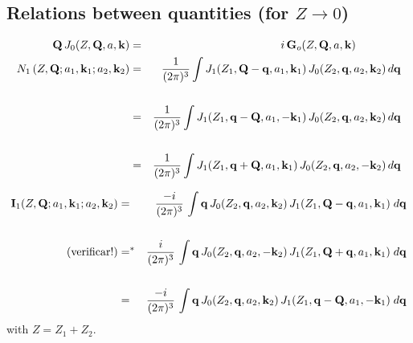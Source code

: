 \subsection{Relations between quantities (for $Z \to 0$)}
%
\begin{eqnarray} \label{Q-N1-Ja}
\mathbf{Q} \, J_{0}(Z , \mathbf{Q}, a , \mathbf{k}) &=& i \, \mathbf{G}_{o} (Z ,
\mathbf{Q}, a , \mathbf{k}) \qquad \qquad
 \\
N_{1} \left(Z,  \mathbf{Q} ; a_{1}, \mathbf{k}_{1} ; a_{2}, \mathbf{k}_{2} \right)
&=&  \frac{1}{(2 \pi)^{3}} \int J_{1}(Z_{1}, \mathbf{Q}
-\mathbf{q},a_{1},\mathbf{k}_{1}) \, J_{0}(Z_{2},  \mathbf{q} ,a_{2},\mathbf{k}_{2} )
\, d \mathbf{q}
 \nonumber \\ \\ \label{Q-N1-Jb}
&=& \frac{1}{(2 \pi)^{3}} \int J_{1}(Z_{1},\mathbf{q} - \mathbf{Q}, a_{1},-
\mathbf{k}_{1}) \, J_{0}(Z_{2}, \mathbf{q} ,a_{2},\mathbf{k}_{2} ) \, d \mathbf{q}
 \nonumber \\ \\ \label{Q-N1-Jc}
&=& \frac{1}{(2 \pi)^{3}} \int J_{1}( Z_{1}, \mathbf{q} + \mathbf{Q}, a_{1},
\mathbf{k}_{1} ) \, J_{0}(Z_{2}, \mathbf{q}  ,a_{2},-\mathbf{k}_{2} ) \, d
\mathbf{q}
\nonumber \\
\end{eqnarray}

\begin{eqnarray} \label{Q-I1-Ja}
\mathbf{I}_{1}(Z,\mathbf{Q}; a_{1},\mathbf{k}_{1}; a_{2},\mathbf{k}_{2} ) &=&\frac{-
i }{(2 \pi)^{3}}\,\int \mathbf{q} \, J_{0}(Z_{2}, \mathbf{q},
a_{2},\mathbf{k}_{2}) \,
J_{1}(Z_{1}, \mathbf{Q}- \mathbf{q}, a_{1}, \mathbf{k}_{1} ) \; d \mathbf{q}
\nonumber \\ \\
\label{Q-I1-Jb} \mbox{(verificar!)} &=^{*}&  \frac{i }{(2
\pi)^{3}}\,\int \mathbf{q} \, J_{0}(Z_{2}, \mathbf{q}, a_{2}, - \mathbf{k}_{2}) \,
J_{1}(Z_{1}, \mathbf{Q} + \mathbf{q}, a_{1}, \mathbf{k}_{1} ) \; d \mathbf{q}
\nonumber \\  \\  \label{Q-I1-Jc} &=&\frac{- i }{(2 \pi)^{3}}\,\int
\mathbf{q} \, J_{0}(Z_{2}, \mathbf{q}, a_{2},\mathbf{k}_{2}) \, J_{1}(Z_{1},
\mathbf{q}- \mathbf{Q}, a_{1}, - \mathbf{k}_{1} ) \;
d \mathbf{q}    \nonumber \\
\end{eqnarray}
with $Z = Z_{1} + Z_{2}$.


